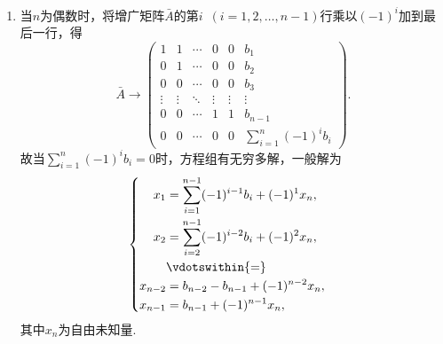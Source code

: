 \documentclass[UTF8,12pt,a4paper,fontset=fandol]{ctexart}
\begin{document}
\begin{solve}
\begin{enumerate}
                \item 当$n$为偶数时，将增广矩阵$\bar{A}$的第$i\enspace(i=1,2,\ldots,n-1)$行乘以$(-1)^i$加到最后一行，得
                      \[ \bar{A}\rightarrow\begin{pmatrix}
                              1      & 1      & \cdots & 0      & 0      & b_1                                  \\
                              0      & 1      & \cdots & 0      & 0      & b_2                                  \\
                              0      & 0      & \cdots & 0      & 0      & b_3                                  \\
                              \vdots & \vdots & \ddots & \vdots & \vdots & \vdots                               \\
                              0      & 0      & \cdots & 1      & 1      & b_{n-1}                              \\
                              0      & 0      & \cdots & 0      & 0      & \displaystyle\sum_{i=1}^{n}(-1)^ib_i
                          \end{pmatrix}. \]
                      故当$\displaystyle\sum_{i=1}^{n}(-1)^ib_i=0$时，方程组有无穷多解，一般解为
                      \[\begin{cases} \begin{aligned}
                                  x_1     & =\displaystyle\sum_{i=1}^{n-1}(-1)^{i-1}b_i+(-1)^1x_n, \\
                                  x_2     & =\displaystyle\sum_{i=2}^{n-1}(-1)^{i-2}b_i+(-1)^2x_n, \\
                                          & \vdotswithin{ = }                                      \\
                                  x_{n-2} & =b_{n-2}-b_{n-1}+(-1)^{n-2}x_n,                        \\
                                  x_{n-1} & =b_{n-1}+(-1)^{n-1}x_n,                                \\
                              \end{aligned} \end{cases}\]
                      其中$x_n$为自由未知量.


\end{enumerate}
\end{solve}
\end{document}
